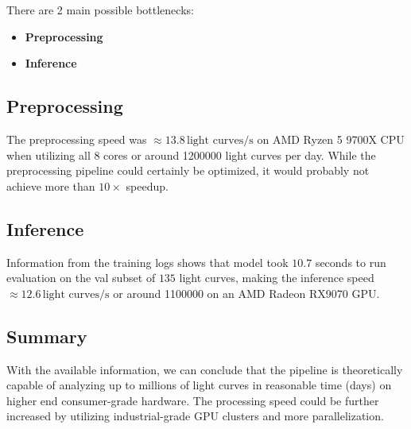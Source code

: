 There are 2 main possible bottlenecks:

\begin{itemize}
    \item \textbf{Preprocessing}
    \item \textbf{Inference}
\end{itemize}

\subsection{Preprocessing}

The preprocessing speed was $\approx 13.8 \, \text{light curves/s}$ on AMD Ryzen 5 9700X CPU when utilizing all 8 cores or around \num{1200000} light curves per day.
While the preprocessing pipeline could certainly be optimized, it would probably not achieve more than $10\times$ speedup.

\subsection{Inference}

Information from the training logs shows that model took $10.7$ seconds to run evaluation on the val subset of $135$ light curves, making the inference speed $\approx 12.6 \, \text{light curves/s}$ or around \num{1100000} on an AMD Radeon RX9070 GPU.

\subsection{Summary}

With the available information, we can conclude that the pipeline is theoretically capable of analyzing up to millions of light curves in reasonable time (days) on higher end consumer-grade hardware.
The processing speed could be further increased by utilizing industrial-grade GPU clusters and more parallelization.